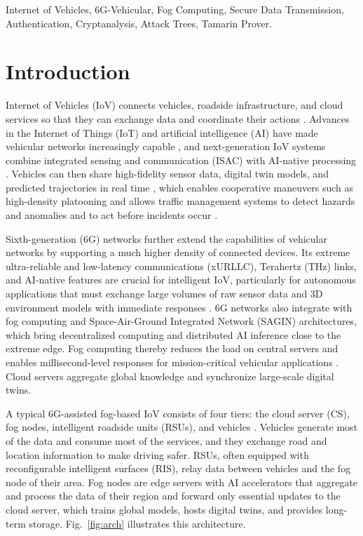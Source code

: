 \documentclass[journal]{IEEEtran}
\theoremstyle{plain}
\theoremstyle{definition}
\begin{document}
\begin{IEEEkeywords}
Internet of Vehicles, 6G-Vehicular, Fog Computing, Secure Data Transmission, Authentication, Cryptanalysis, Attack Trees, Tamarin Prover.
\end{IEEEkeywords}

\section{Introduction}
 Internet of Vehicles (IoV) connects vehicles, roadside infrastructure, and cloud services so that they can exchange data and coordinate their actions \cite{ji2020survey}. Advances in the Internet of Things (IoT) and artificial intelligence (AI) have made vehicular networks increasingly capable \cite{mchergui2022survey}, and next-generation IoV systems combine integrated sensing and communication (ISAC) with AI-native processing \cite{nataraja2024integrated}. Vehicles can then share high-fidelity sensor data, digital twin models, and predicted trajectories in real time \cite{cheng2025foundation}, which enables cooperative maneuvers such as high-density platooning and allows traffic management systems to detect hazards and anomalies and to act before incidents occur \cite{tanha2026cooperative}.

Sixth-generation (6G) networks further extend the capabilities of vehicular networks by supporting a much higher density of connected devices. Its extreme ultra-reliable and low-latency communications (xURLLC), Terahertz (THz) links, and AI-native features are crucial for intelligent IoV, particularly for autonomous applications that must exchange large volumes of raw sensor data and 3D environment models with immediate responses \cite{kumar2024iov}. 6G networks also integrate with fog computing and Space-Air-Ground Integrated Network (SAGIN) architectures, which bring decentralized computing and distributed AI inference close to the extreme edge. Fog computing thereby reduces the load on central servers and enables millisecond-level responses for mission-critical vehicular applications \cite{zhou2023edge}. Cloud servers aggregate global knowledge and synchronize large-scale digital twins.

A typical 6G-assisted fog-based IoV consists of four tiers: the cloud server (CS), fog nodes, intelligent roadside units (RSUs), and vehicles \cite{kumar2024iov}. Vehicles generate most of the data and consume most of the services, and they exchange road and location information to make driving safer. RSUs, often equipped with reconfigurable intelligent surfaces (RIS), relay data between vehicles and the fog node of their area. Fog nodes are edge servers with AI accelerators that aggregate and process the data of their region and forward only essential updates to the cloud server, which trains global models, hosts digital twins, and provides long-term storage. Fig.~\ref{fig:arch} illustrates this architecture.
\end{document}
